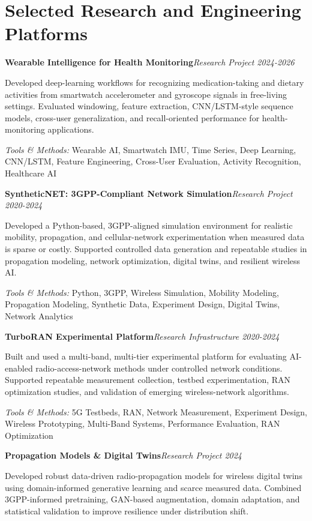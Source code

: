 \documentclass[9pt,letterpaper]{extarticle}
\newcommand{\entry}[2]{\Needspace{4\baselineskip}\textbf{#1}\hfill\textit{#2}\par}
\begin{document}
\section{Selected Research and Engineering Platforms}
\entry{Wearable Intelligence for Health Monitoring}{Research Project \textbar{} 2024-2026}
Developed deep-learning workflows for recognizing medication-taking and dietary activities from smartwatch accelerometer and gyroscope signals in free-living settings. Evaluated windowing, feature extraction, CNN/LSTM-style sequence models, cross-user generalization, and recall-oriented performance for health-monitoring applications.\par
{\small\textit{Tools \& Methods:} Wearable AI, Smartwatch IMU, Time Series, Deep Learning, CNN/LSTM, Feature Engineering, Cross-User Evaluation, Activity Recognition, Healthcare AI\par}
\vspace{1pt}
\entry{SyntheticNET: 3GPP-Compliant Network Simulation}{Research Project \textbar{} 2020-2024}
Developed a Python-based, 3GPP-aligned simulation environment for realistic mobility, propagation, and cellular-network experimentation when measured data is sparse or costly. Supported controlled data generation and repeatable studies in propagation modeling, network optimization, digital twins, and resilient wireless AI.\par
{\small\textit{Tools \& Methods:} Python, 3GPP, Wireless Simulation, Mobility Modeling, Propagation Modeling, Synthetic Data, Experiment Design, Digital Twins, Network Analytics\par}
\vspace{1pt}
\entry{TurboRAN Experimental Platform}{Research Infrastructure \textbar{} 2020-2024}
Built and used a multi-band, multi-tier experimental platform for evaluating AI-enabled radio-access-network methods under controlled network conditions. Supported repeatable measurement collection, testbed experimentation, RAN optimization studies, and validation of emerging wireless-network algorithms.\par
{\small\textit{Tools \& Methods:} 5G Testbeds, RAN, Network Measurement, Experiment Design, Wireless Prototyping, Multi-Band Systems, Performance Evaluation, RAN Optimization\par}
\vspace{1pt}
\entry{Propagation Models \& Digital Twins}{Research Project \textbar{} 2024}
Developed robust data-driven radio-propagation models for wireless digital twins using domain-informed generative learning and scarce measured data. Combined 3GPP-informed pretraining, GAN-based augmentation, domain adaptation, and statistical validation to improve resilience under distribution shift.\par
\end{document}
